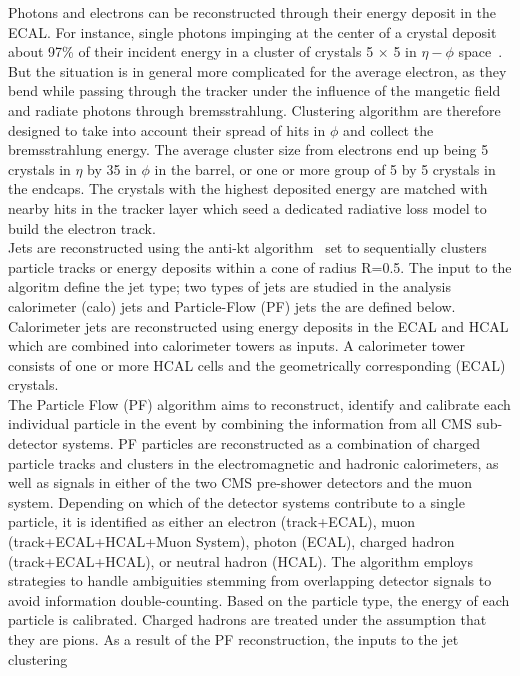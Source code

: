 \indent Photons and electrons can be reconstructed through their energy deposit in the ECAL. 
For instance, single photons impinging at the center of a crystal deposit about 97\% of their 
incident energy in a cluster of crystals 5 $\times$ 5 in $\eta-\phi$ space~\cite{Bayatian:922757}. 
But the situation is in general more complicated for the average electron, as they bend while 
passing through the tracker under the influence of the mangetic field and radiate photons through 
bremsstrahlung. Clustering algorithm are therefore designed to take into account their spread of 
hits in $\phi$ and collect the bremsstrahlung energy. The average cluster size from electrons end 
up being 5 crystals in $\eta$ by 35 in $\phi$ in the barrel, or one or more group of 5 by 5 
crystals in the endcaps. The crystals with the highest deposited energy are matched with nearby 
hits in the tracker layer which seed a dedicated radiative loss model to build the electron track.\\
\indent Jets are reconstructed using the anti-kt algorithm~\cite{antikt} set to sequentially clusters 
particle tracks or energy deposits within a cone of radius R=0.5. The input to the algoritm define
the jet type; two types of jets are studied in the analysis calorimeter (calo) jets and Particle-Flow 
(PF) jets the are defined below.\\
\indent Calorimeter jets are reconstructed using energy deposits in the ECAL and HCAL which are 
combined into calorimeter towers as inputs. A calorimeter tower consists of one or more HCAL cells 
and the geometrically corresponding (ECAL) crystals.\\
\indent The Particle Flow (PF) algorithm aims to reconstruct, identify and calibrate each individual 
particle in the event by combining the information from all CMS sub-detector systems. PF particles are 
reconstructed as a combination of charged particle tracks and clusters in the electromagnetic 
and hadronic calorimeters, as well as signals in either of the two CMS pre-shower detectors 
and the muon system. Depending on which of the detector systems contribute to a single particle, 
it is identified as either an electron (track+ECAL), muon (track+ECAL+HCAL+Muon System), photon (ECAL), 
charged hadron (track+ECAL+HCAL), or neutral hadron (HCAL). The algorithm employs strategies to handle 
ambiguities stemming from overlapping detector signals to avoid information double-counting. Based on 
the particle type, the energy of each particle is calibrated. Charged hadrons are treated under the 
assumption that they are pions. As a result of the PF reconstruction, the inputs to the jet clustering 
